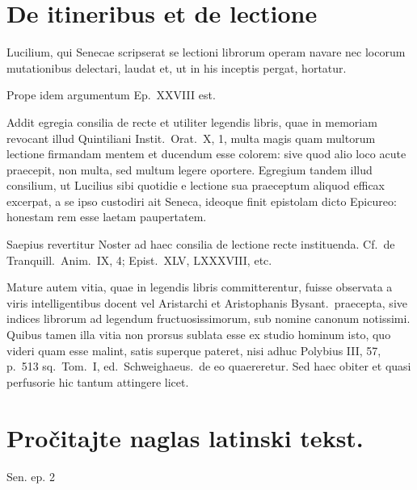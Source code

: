 


\section*{De itineribus et de lectione}

Lucilium, qui Senecae scripserat se lectioni librorum operam navare nec locorum mutationibus delectari, laudat et, ut in his inceptis pergat, hortatur.

Prope idem argumentum Ep.\ XXVIII est.

Addit egregia consilia de recte et utiliter legendis libris, quae in memoriam revocant illud Quintiliani Instit.\ Orat.\ X, 1, multa magis quam multorum lectione firmandam mentem et ducendum esse colorem: sive quod alio loco acute praecepit, non multa, sed multum legere oportere. Egregium tandem illud consilium, ut Lucilius sibi quotidie e lectione sua praeceptum aliquod efficax excerpat, a se ipso custodiri ait Seneca, ideoque finit epistolam dicto Epicureo: honestam rem esse laetam paupertatem.

Saepius revertitur Noster ad haec consilia de lectione recte instituenda. Cf.\ de Tranquill.\ Anim.\ IX, 4; Epist.\ XLV, LXXXVIII, etc.

Mature autem vitia, quae in legendis libris committerentur, fuisse observata a viris intelligentibus docent vel Aristarchi et Aristophanis Bysant.\ praecepta, sive indices librorum ad legendum fructuosissimorum, sub nomine canonum notissimi. Quibus tamen illa vitia non prorsus sublata esse ex studio hominum isto, quo videri quam esse malint, satis superque pateret, nisi adhuc Polybius III, 57, p.\ 513 sq.\ Tom.\ I, ed.\ Schweighaeus.\ de eo quaereretur. Sed haec obiter et quasi perfusorie hic tantum attingere licet.

\newpage

\section*{Pročitajte naglas latinski tekst.}


Sen. ep. 2

\medskip

